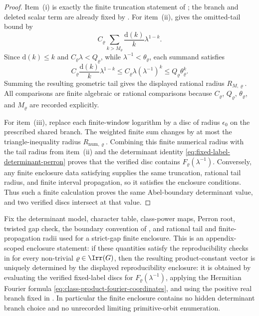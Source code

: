 \begin{proof}
  Item~\textup{(i)} is exactly the finite truncation statement of
  ; the branch and deleted
  scalar term are already fixed by
  .  For item~\textup{(ii)},
   gives the omitted-tail bound
  by
  \[
    C_\varrho
    \sum_{k>M_\varrho}\frac{\mathrm d(k)}{k}\lambda^{1-k}.
  \]
  Since \(\mathrm d(k)\le k\) and
  \(C_\varrho\lambda<Q_\varrho\), while
  \(\lambda^{-1}<\theta_\varrho\), each summand satisfies
  \[
    C_\varrho\frac{\mathrm d(k)}{k}\lambda^{1-k}
    \le C_\varrho\lambda(\lambda^{-1})^k
    \le Q_\varrho\theta_\varrho^k .
  \]
  Summing the resulting geometric tail gives the displayed rational radius
  \(R_{M,\varrho}\).  All comparisons are finite algebraic or rational
  comparisons because \(C_\varrho\), \(Q_\varrho\), \(\theta_\varrho\), and
  \(M_\varrho\) are recorded explicitly.

  For item~\textup{(iii)}, replace each finite-window logarithm by a disc of
  radius \(\epsilon_0\) on the prescribed shared branch.  The weighted finite
  sum changes by at most the triangle-inequality radius
  \(R_{\mathrm{num},\varrho}\).  Combining this finite numerical radius with
  the tail radius from item~\textup{(ii)} and the determinant identity
  \eqref{eq:fixed-label-determinant-perron} proves that the verified disc
  contains \(F_\varrho(\lambda^{-1})\).  Conversely, any finite enclosure data satisfying
   supplies the same
  truncation, rational tail radius, and finite interval propagation, so it
  satisfies the enclosure conditions.  Thus such a
  finite calculation proves the same Abel-boundary determinant value, and two
  verified discs intersect at that value.
\end{proof}

\begin{lemma}
  \label{cor:main-iii-branch-tail-certificate-soundness}
  \label{cor:main-iii-branch-tail-enclosure}
  Fix the determinant model, character table, class-power maps, Perron root,
  twisted gap check, the boundary convention of
  , and rational tail and
  finite-propagation radii used for a strict-gap finite enclosure.  This is an
  appendix-scoped enclosure statement: if these quantities satisfy the
  reproducibility checks in  for
  every non-trivial \(\varrho\in\Irr(G)\), then the resulting product-constant
  vector is uniquely determined by the displayed reproducibility enclosure: it
  is obtained by evaluating the verified fixed-label discs for
  \(F_\varrho(\lambda^{-1})\), applying the Hermitian Fourier formula
  \eqref{eq:class-product-fourier-coordinates}, and using the positive real branch
  fixed in .  In particular the
  finite enclosure contains no hidden determinant branch choice and no
  unrecorded limiting primitive-orbit enumeration.
\end{lemma}

